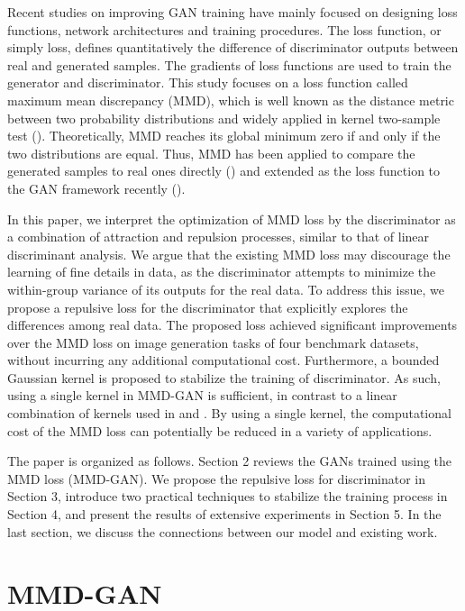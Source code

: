 \documentclass{article} %
\theoremstyle{plain}
\newtheorem*{proposition 1*}{Proposition 1}
\begin{document}
Recent studies on improving GAN training have mainly focused on designing loss functions, network architectures and training procedures. The loss function, or simply loss, defines quantitatively the difference of discriminator outputs between real and generated samples. The gradients of loss functions are used to train the generator and discriminator. This study focuses on a loss function called maximum mean discrepancy (MMD), which is well known as the distance metric between two probability distributions and widely applied in kernel two-sample test (\cite{mmdtest}). Theoretically, MMD reaches its global minimum zero if and only if the two distributions are equal. Thus, MMD has been applied to compare the generated samples to real ones directly (\cite{gmmn,gmmn2}) and extended as the loss function to the GAN framework recently (\cite{coulomb,mmd_gan_g,mmd_gan_t}).

In this paper, we interpret the optimization of MMD loss by the discriminator as a combination of attraction and repulsion processes, similar to that of linear discriminant analysis. We argue that the existing MMD loss may discourage the learning of fine details in data, as the discriminator attempts to minimize the within-group variance of its outputs for the real data. To address this issue, we propose a repulsive loss for the discriminator that explicitly explores the differences among real data. The proposed loss achieved significant improvements over the MMD loss on image generation tasks of four benchmark datasets, without incurring any additional computational cost. Furthermore, a bounded Gaussian kernel is proposed to stabilize the training of discriminator. As such, using a single kernel in MMD-GAN is sufficient, in contrast to a linear combination of kernels used in \cite{mmd_gan_g} and \cite{mmd_gan_t}. By using a single kernel, the computational cost of the MMD loss can potentially be reduced in a variety of applications. 

The paper is organized as follows. Section 2 reviews the GANs trained using the MMD loss (MMD-GAN). We propose the repulsive loss for discriminator in Section 3, introduce two practical techniques to stabilize the training process in Section 4, and present the results of extensive experiments in Section 5. In the last section, we discuss the connections between our model and existing work.

\section{MMD-GAN}
\label{sec:all_the_gans}
\end{document}

